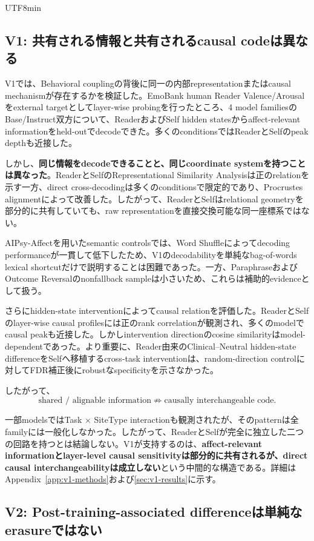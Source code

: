 \documentclass{article} %
\begin{document}
\begin{CJK*}{UTF8}{min}
\subsection{V1: 共有される情報と共有されるcausal codeは異なる}

V1では、Behavioral couplingの背後に同一の内部representationまたはcausal mechanismが存在するかを検証した。EmoBank human Reader Valence/Arousalをexternal targetとしてlayer-wise probingを行ったところ、4 model familiesのBase/Instruct双方について、ReaderおよびSelf hidden statesからaffect-relevant informationをheld-outでdecodeできた。多くのconditionsではReaderとSelfのpeak depthも近接した。

しかし、\textbf{同じ情報をdecodeできることと、同じcoordinate systemを持つことは異なった}。ReaderとSelfのRepresentational Similarity Analysisは正のrelationを示す一方、direct cross-decodingは多くのconditionsで限定的であり、Procrustes alignmentによって改善した。したがって、ReaderとSelfはrelational geometryを部分的に共有していても、raw representationを直接交換可能な同一座標系ではない。

AIPsy-Affectを用いたsemantic controlsでは、Word Shuffleによってdecoding performanceが一貫して低下したため、V1のdecodabilityを単純なbag-of-words lexical shortcutだけで説明することは困難であった。一方、ParaphraseおよびOutcome Reversalのnonfallback sampleは小さいため、これらは補助的evidenceとして扱う。

さらにhidden-state interventionによってcausal relationを評価した。ReaderとSelfのlayer-wise causal profilesには正のrank correlationが観測され、多くのmodelでcausal peakも近接した。しかしintervention directionのcosine similarityはmodel-dependentであった。より重要に、Reader由来のClinical--Neutral hidden-state differenceをSelfへ移植するcross-task interventionは、random-direction controlに対してFDR補正後にrobustなspecificityを示さなかった。

したがって、
\[
\text{shared / alignable information}
\not\Rightarrow
\text{causally interchangeable code}.
\]

一部modelsではTask $\times$ SiteType interactionも観測されたが、そのpatternは全familyには一般化しなかった。したがって、ReaderとSelfが完全に独立した二つの回路を持つとは結論しない。V1が支持するのは、\textbf{affect-relevant informationとlayer-level causal sensitivityは部分的に共有されるが、direct causal interchangeabilityは成立しない}という中間的な構造である。詳細はAppendix~\ref{app:v1-methods}および\ref{sec:v1-results}に示す。


\subsection{V2: Post-training-associated differenceは単純なerasureではない}


\end{CJK*}
\end{document}
